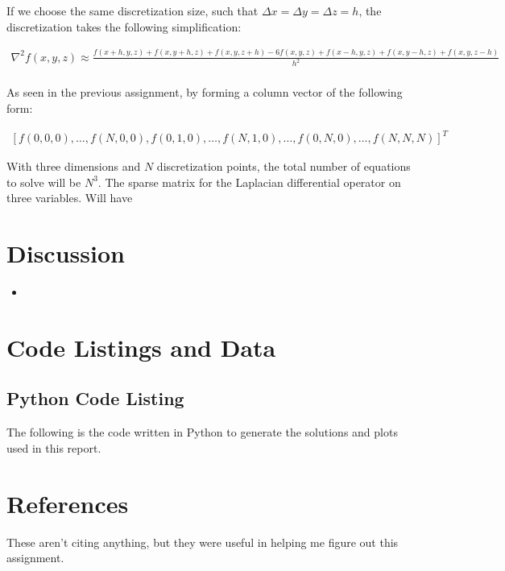 \documentclass[10pt, oneside, letterpaper]{article}
\begin{document}
If we choose the same discretization size, such that $\Delta x = \Delta y = \Delta z = h$, the discretization takes the following simplification:

\begin{align*}
  \nabla^2f(x, y, z) \approx \frac{f(x+h,y,z) + f(x,y+h,z) + f(x,y,z+h) - 6f(x, y, z) + f(x-h,y,z) + f(x,y-h,z) + f(x,y,z-h)}{h^2}\\
\end{align*}

As seen in the previous assignment, by forming a column vector of the following form:

\begin{align*}
  \left[f(0,0,0), \hdots ,f(N,0,0),f(0,1,0),\hdots,f(N,1,0),\hdots,f(0,N,0),\hdots,f(N,N,N)\right]^T
\end{align*}

With three dimensions and $N$ discretization points, the total number of equations to solve will be $N^3$. The sparse matrix for the Laplacian differential operator on three variables. Will have 


\section{Discussion}

\begin{itemize}
    \item 
\end{itemize}

\newpage
\section{Code Listings and Data}

\subsection{Python Code Listing}
\label{code-listing-python}
The following is the code written in Python to generate the solutions and plots used in this report.


\newpage
\section{References}

These aren't citing anything, but they were useful in helping me figure out this assignment.
\end{document}
